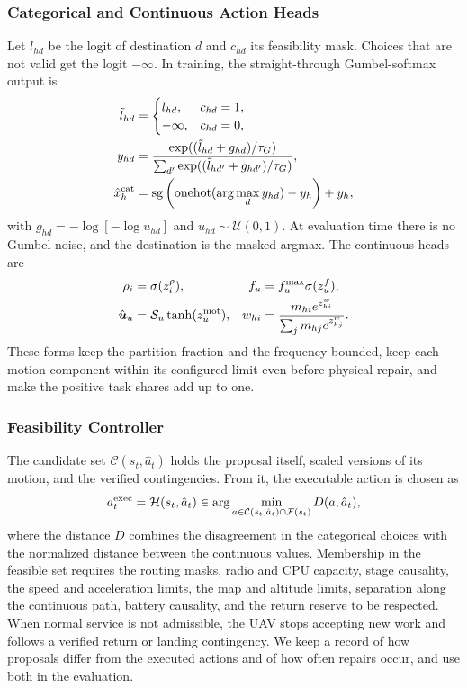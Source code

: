 \subsubsection{Categorical and Continuous Action Heads}
Let $l_{hd}$ be the logit of destination $d$ and $c_{hd}$ its feasibility
mask. Choices that are not valid get the logit $-\infty$. In training, the
straight-through Gumbel-softmax output is
\begin{align}
\tilde l_{hd}&=\begin{cases}l_{hd},&c_{hd}=1,\\-\infty,&c_{hd}=0,\end{cases}
\nonumber\\
y_{hd}&=\frac{\exp((\tilde l_{hd}+g_{hd})/\tau_G)}
{\sum_{d'}\exp((\tilde l_{hd'}+g_{hd'})/\tau_G)},\nonumber\\
\hat x_h^{\rm cat}&=\operatorname{sg}
\left(\operatorname{onehot}(\arg\max_d y_{hd})-y_h\right)+y_h,
\label{eq:gumbel_action}
\end{align}
with $g_{hd}=-\log[-\log u_{hd}]$ and $u_{hd}\sim\mathcal U(0,1)$. At
evaluation time there is no Gumbel noise, and the destination is the masked
argmax. The continuous heads are
\begin{align}
\rho_i&=\sigma(z_i^\rho),
&f_u&=f_u^{\max}\sigma(z_u^f),\nonumber\\
\hat{\boldsymbol{u}}_u&=\mathcal S_u\tanh(z_u^{\rm mot}),
&w_{hi}&=\frac{m_{hi}e^{z_{hi}^w}}{\sum_jm_{hj}e^{z_{hj}^w}}.
\label{eq:continuous_heads}
\end{align}
These forms keep the partition fraction and the frequency bounded, keep each
motion component within its configured limit even before physical repair,
and make the positive task shares add up to one.

\subsubsection{Feasibility Controller}
The candidate set $\mathcal C(s_t,\hat a_t)$ holds the proposal itself,
scaled versions of its motion, and the verified contingencies. From it, the
executable action is chosen as
\begin{equation}
a_t^{\rm exec}=\mathcal H(s_t,\hat a_t)
\in\arg\min_{a\in\mathcal C(s_t,\hat a_t)\cap\mathcal F(s_t)}
D(a,\hat a_t),
\label{eq:feasibility_projection}
\end{equation}
where the distance $D$ combines the disagreement in the categorical choices
with the normalized distance between the continuous values. Membership in the
feasible set requires the routing masks, radio and CPU capacity, stage
causality, the speed and acceleration limits, the map and altitude limits,
separation along the continuous path, battery causality, and the return
reserve to be respected. When normal service is not admissible, the UAV stops
accepting new work and follows a verified return or landing contingency. We
keep a record of how proposals differ from the executed actions and of how
often repairs occur, and use both in the evaluation.

